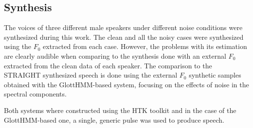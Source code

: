 \subsection{Synthesis}
\label{experiments_synthesis}
The voices of three different male speakers under different noise conditions were synthesized during this work.
%
The clean and all the noisy cases were synthesized using the $F_{0}$ extracted from each case.
%
However, the problems with its estimation are clearly audible when comparing to the synthesis done with an external $F_{0}$ extracted from the clean data of each speaker.
%
The comparison to the STRAIGHT synthesized speech is done using the external $F_{0}$ synthetic samples obtained with the GlottHMM-based system, focusing on the effects of noise in the spectral components.

Both systems where constructed using the HTK toolkit \cite{young1997htk} and in the case of the GlottHMM-based one, a single, generic pulse was used to produce speech.